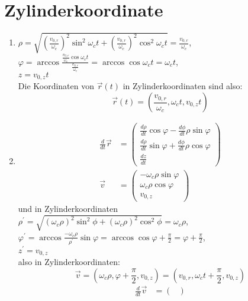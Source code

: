 \documentclass[sectionformat = aufgabe]{gadsescript}
\begin{document}
\section{Zylinderkoordinate}
\begin{enumerate}[label=\alph*)]
	\item $ \rho = \sqrt{ \left(\frac{v_{0,r}}{\omega_c}\right)^2 \sin^2 \omega_c t + \left(\frac{v_{0,r}}{\omega_c}\right)^2 \cos^2 \omega_c t} = \frac{v_{0,r}}{\omega_c} $,\\
		$ \varphi = \arccos \frac{\frac{v_{0,r}}{\omega_c} \cos \omega_c t}{\frac{v_{0,r}}{\omega_c}} = \arccos \cos \omega_c t = \omega_c t $, \\
		$ z = v_{0,z} t $\\
		Die Koordinaten von $ \vec r (t) $ in Zylinderkoordinaten sind also:
		\[ \vec r (t) = \left( \frac{v_{0,r}}{\omega_c}, \omega_c t, v_{0,z} t \right)\]
	\item
		\begin{align*}
			\frac{d}{dt} \vec r &=
			\begin{pmatrix}
				\frac{d\rho}{dt} \cos \varphi - \frac{d\phi}{dt} \rho \sin \varphi\\
				\frac{d\rho}{dt} \sin \varphi + \frac{d\phi}{dt} \rho \cos \varphi\\
				\frac{dz}{dt}
			\end{pmatrix}\\
			\vec v &= 
			\begin{pmatrix}
				- \omega_c \rho \sin \varphi\\
				\omega_c \rho \cos \varphi\\
				v_{0,z}
			\end{pmatrix}
		\end{align*}
		und in Zylinderkoordinaten\\
		$ \rho^\prime = \sqrt{ \left(\omega_c \rho \right)^2 \sin^2 \phi + \left(\omega_c \rho\right)^2 \cos^2 \phi} = \omega_c \rho $,\\
		$ \varphi^\prime = \arccos \frac{-\omega_c \rho}{\rho^\prime} \sin \varphi = \arccos \cos \varphi + \frac{\pi}{2} = \varphi + \frac{\pi}{2} $, \\
		$ z^\prime = v_{0,z} $\\
		also in Zylinderkoordinaten:
		\[ \vec v = \left( \omega_c \rho, \varphi + \frac{\pi}{2}, v_{0,z} \right) = \left( v_{0, r}, \omega_c t + \frac{\pi}{2}, v_{0, z} \right)\]
		\begin{align*}
			\frac{d}{dt} \vec v &=
			\begin{pmatrix}

\end{pmatrix}
\end{align*}
\end{enumerate}
\end{document}
